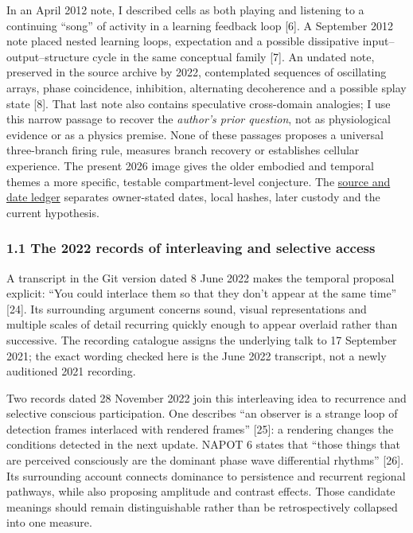 \documentclass[
  american,
  11pt,
  letterpaper,
]{article}
\begin{document}
In an April 2012 note, I described cells as both playing and listening to a continuing ``song'' of activity in a learning feedback loop {[}6{]}. A September 2012 note placed nested learning loops, expectation and a possible dissipative input--output--structure cycle in the same conceptual family {[}7{]}. An undated note, preserved in the source archive by 2022, contemplated sequences of oscillating arrays, phase coincidence, inhibition, alternating decoherence and a possible splay state {[}8{]}. That last note also contains speculative cross-domain analogies; I use this narrow passage to recover the \emph{author's prior question}, not as physiological evidence or as a physics premise. None of these passages proposes a universal three-branch firing rule, measures branch recovery or establishes cellular experience. The present 2026 image gives the older embodied and temporal themes a more specific, testable compartment-level conjecture. The \href{https://github.com/v5ma/v5ma.github.io/blob/f6d3867df89ae9dea32f763b1d55c84212c41cc6/papers/companions/five-papers-20260923/temporal/paper/SOURCE-AND-NONDUPLICATION.md}{source and date ledger} separates owner-stated dates, local hashes, later custody and the current hypothesis.

\subsubsection{1.1 The 2022 records of interleaving and selective access}\label{the-2022-records-of-interleaving-and-selective-access}

A transcript in the Git version dated 8 June 2022 makes the temporal proposal explicit: ``You could interlace them so that they don't appear at the same time'' {[}24{]}. Its surrounding argument concerns sound, visual representations and multiple scales of detail recurring quickly enough to appear overlaid rather than successive. The recording catalogue assigns the underlying talk to 17 September 2021; the exact wording checked here is the June 2022 transcript, not a newly auditioned 2021 recording.

Two records dated 28 November 2022 join this interleaving idea to recurrence and selective conscious participation. One describes ``an observer is a strange loop of detection frames interlaced with rendered frames'' {[}25{]}: a rendering changes the conditions detected in the next update. NAPOT 6 states that ``those things that are perceived consciously are the dominant phase wave differential rhythms'' {[}26{]}. Its surrounding account connects dominance to persistence and recurrent regional pathways, while also proposing amplitude and contrast effects. Those candidate meanings should remain distinguishable rather than be retrospectively collapsed into one measure.
\end{document}
